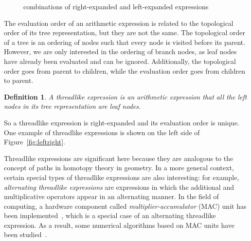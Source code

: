 \documentclass{article}
\newtheorem{definition}{Definition}
\numberwithin{definition}{section}
\numberwithin{lemma}{section}
\numberwithin{proposition}{section}
\numberwithin{corollary}{section}
\numberwithin{theorem}{section}
\begin{document}
\begin{figure}[ht]
    \centering
    \caption{combinations of right-expanded and left-expanded expressions}\label{fig:combination}
\end{figure}

The evaluation order of an arithmetic expression is related to the topological order of its tree representation, but they are not the same.
The topological order of a tree is an ordering of nodes such that every node is visited before its parent\cite{Knuth1997TheAO}.
However, we are only interested in the ordering of branch nodes, as leaf nodes have already been evaluated and can be ignored.
Additionally, the topological order goes from parent to children, while the evaluation order goes from children to parent.

\begin{definition}
    A threadlike expression is an arithmetic expression that all the left nodes in its tree representation are leaf nodes.
\end{definition}

So a threadlike expression is right-expanded and its evaluation order is unique.
One example of threadlike expressions is shown on the left side of Figure~\ref{fig:leftright}.

Threadlike expressions are significant here because they are analogous to the concept of paths in homotopy theory in geometry.
In a more general context, certain special types of threadlike expressions are also interesting:
for example, \emph{alternating threadlike expressions} are expressions in which the additional and multiplicative operators appear in an alternating manner.
In the field of computing, a hardware component called \emph{multiplier-accumulator} (MAC) unit has been implemented~\cite{Quinnell2007FloatingPointFM},
which is a special case of an alternating threadlike expression.
As a result, some numerical algorithms based on MAC units have been studied~\cite{Markstein2004SoftwareDA}.
\end{document}

